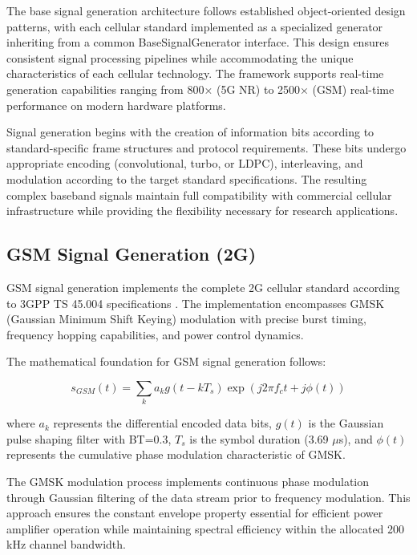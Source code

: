 \documentclass[twocolumn]{article}
\begin{document}
The base signal generation architecture follows established object-oriented design patterns, with each cellular standard implemented as a specialized generator inheriting from a common BaseSignalGenerator interface. This design ensures consistent signal processing pipelines while accommodating the unique characteristics of each cellular technology. The framework supports real-time generation capabilities ranging from 800× (5G NR) to 2500× (GSM) real-time performance on modern hardware platforms.

Signal generation begins with the creation of information bits according to standard-specific frame structures and protocol requirements. These bits undergo appropriate encoding (convolutional, turbo, or LDPC), interleaving, and modulation according to the target standard specifications. The resulting complex baseband signals maintain full compatibility with commercial cellular infrastructure while providing the flexibility necessary for research applications.

\subsection{GSM Signal Generation (2G)}

GSM signal generation implements the complete 2G cellular standard according to 3GPP TS 45.004 specifications \cite{3gpp2018ts45004}. The implementation encompasses GMSK (Gaussian Minimum Shift Keying) modulation with precise burst timing, frequency hopping capabilities, and power control dynamics.

The mathematical foundation for GSM signal generation follows:

\begin{equation}
s_{GSM}(t) = \sum_{k} a_k g(t-kT_s) \exp\left(j2\pi f_c t + j\phi(t)\right)
\end{equation}

where $a_k$ represents the differential encoded data bits, $g(t)$ is the Gaussian pulse shaping filter with BT=0.3, $T_s$ is the symbol duration (3.69 $\mu$s), and $\phi(t)$ represents the cumulative phase modulation characteristic of GMSK.

The GMSK modulation process implements continuous phase modulation through Gaussian filtering of the data stream prior to frequency modulation. This approach ensures the constant envelope property essential for efficient power amplifier operation while maintaining spectral efficiency within the allocated 200 kHz channel bandwidth.
\end{document}
